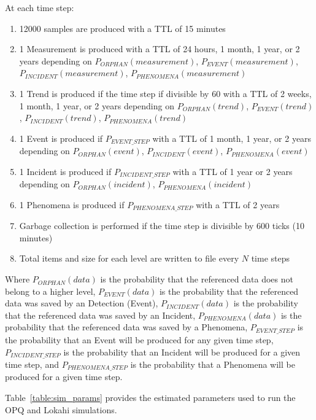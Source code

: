 At each time step:
\begin{enumerate}
	\item 12000 samples are produced with a TTL of 15 minutes
	\item 1 Measurement is produced with a TTL of 24 hours, 1 month, 1 year, or 2 years depending on $P_{ORPHAN}(measurement)$, $P_{EVENT}(measurement)$, $P_{INCIDENT}(measurement)$, $P_{PHENOMENA}(measurement)$
	\item 1 Trend is produced if the time step if divisible by 60 with a TTL of 2 weeks, 1 month, 1 year, or 2 years depending on $P_{ORPHAN}(trend)$, $P_{EVENT}(trend)$, $P_{INCIDENT}(trend)$, $P_{PHENOMENA}(trend)$
	\item 1 Event is produced if $P_{EVENT\_STEP}$ with a TTL of 1 month, 1 year, or 2 years depending on $P_{ORPHAN}(event)$, $P_{INCIDENT}(event)$, $P_{PHENOMENA}(event)$
	\item 1 Incident is produced if $P_{INCIDENT\_STEP}$ with a TTL of 1 year or 2 years depending on $P_{ORPHAN}(incident)$, $P_{PHENOMENA}(incident)$
	\item 1 Phenomena is produced if $P_{PHENOMENA\_STEP}$ with a TTL of 2 years
	\item Garbage collection is performed if the time step is divisible by 600 ticks (10 minutes)
	\item Total items and size for each level are written to file every $N$ time steps
\end{enumerate}

Where $P_{ORPHAN}(data)$ is the probability that the referenced data does not belong to a higher level, $P_{EVENT}(data)$ is the probability that the referenced data was saved by an Detection (Event), $P_{INCIDENT}(data)$ is the probability that the referenced data was saved by an Incident, $P_{PHENOMENA}(data)$ is the probability that the referenced data was saved by a Phenomena, $P_{EVENT\_STEP}$ is the probability that an Event will be produced for any given time step, $P_{INCIDENT\_STEP}$ is the probability that an Incident will be produced for a given time step, and $P_{PHENOMENA\_STEP}$ is the probability that a Phenomena will be produced for a given time step.

Table~\ref{table:sim_params} provides the estimated parameters used to run the OPQ and Lokahi simulations.

